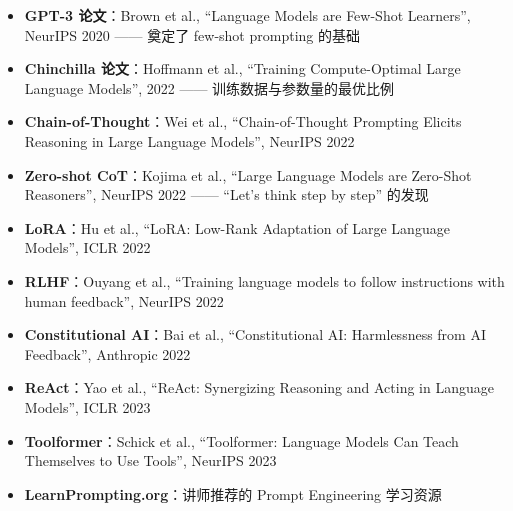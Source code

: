 \begin{itemize}
    \item \textbf{GPT-3 论文}：Brown et al., ``Language Models are Few-Shot Learners'', NeurIPS 2020 —— 奠定了 few-shot prompting 的基础
    \item \textbf{Chinchilla 论文}：Hoffmann et al., ``Training Compute-Optimal Large Language Models'', 2022 —— 训练数据与参数量的最优比例
    \item \textbf{Chain-of-Thought}：Wei et al., ``Chain-of-Thought Prompting Elicits Reasoning in Large Language Models'', NeurIPS 2022
    \item \textbf{Zero-shot CoT}：Kojima et al., ``Large Language Models are Zero-Shot Reasoners'', NeurIPS 2022 —— ``Let's think step by step'' 的发现
    \item \textbf{LoRA}：Hu et al., ``LoRA: Low-Rank Adaptation of Large Language Models'', ICLR 2022
    \item \textbf{RLHF}：Ouyang et al., ``Training language models to follow instructions with human feedback'', NeurIPS 2022
    \item \textbf{Constitutional AI}：Bai et al., ``Constitutional AI: Harmlessness from AI Feedback'', Anthropic 2022
    \item \textbf{ReAct}：Yao et al., ``ReAct: Synergizing Reasoning and Acting in Language Models'', ICLR 2023
    \item \textbf{Toolformer}：Schick et al., ``Toolformer: Language Models Can Teach Themselves to Use Tools'', NeurIPS 2023
    \item \textbf{LearnPrompting.org}：讲师推荐的 Prompt Engineering 学习资源
\end{itemize}



